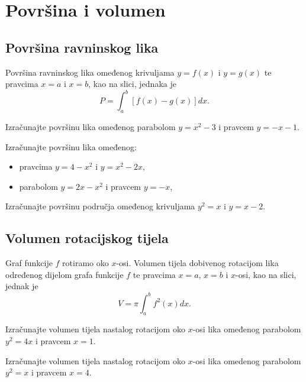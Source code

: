 \section{Površina i volumen}

\subsection{Površina ravninskog lika}

Površina ravninskog lika omeđenog krivuljama $y=f(x)$ i $y=g(x)$ te pravcima
$x=a$ i $x=b$, kao na slici, jednaka je
$$
    P=\int_a^b [f(x) - g(x)] dx.
$$

\begin{example}
    Izračunajte površinu lika omeđenog parabolom $y=x^2-3$ i pravcem $y=-x-1$.
\end{example}

\begin{example}
    Izračunajte površinu lika omeđenog:
    \begin{itemize}
        \item pravcima $y=4-x^2$ i $y=x^2-2x$,
        \item parabolom $y=2x-x^2$ i pravcem $y=-x$,
    \end{itemize}
\end{example}


\begin{example}
    Izračunajte površinu područja omeđenog krivuljama $y^2=x$ i $y=x-2$.
\end{example}

\subsection{Volumen rotacijskog tijela}

Graf funkcije $f$ rotiramo oko $x$-osi. Volumen tijela dobivenog rotacijom lika
određenog dijelom grafa funkcije $f$ te pravcima $x=a$, $x=b$ i $x$-osi, kao na
slici, jednak je
$$
    V=\pi \int_a^b f^2(x)dx.
$$

\begin{example}
    Izračunajte volumen tijela nastalog rotacijom oko $x$-osi lika omeđenog
    parabolom $y^2=4x$ i pravcem $x=1$.
\end{example}

\begin{example}
    Izračunajte volumen tijela nastalog rotacijom oko $x$-osi lika omedenog
    parabolom $y^2 = x$ i pravcem $x=4$.
\end{example}

